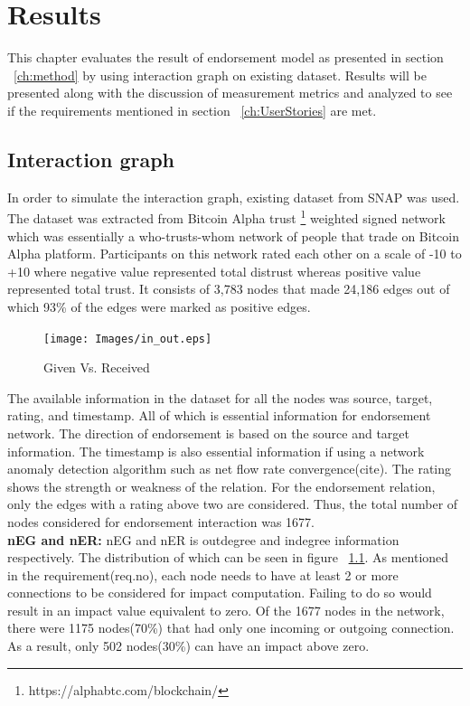 \chapter{Results} \label{ch:results}
This chapter evaluates the result of endorsement model as presented in section
~\ref{ch:method} by using interaction graph on existing dataset. Results will
be presented along with the discussion of measurement metrics and analyzed to
see if the requirements mentioned in section ~\ref{ch:UserStories} are met.  

\section{Interaction graph}
In order to simulate the interaction graph, existing dataset from SNAP
\cite{snapnets} was used. The dataset was extracted from Bitcoin Alpha trust
\footnote{https://alphabtc.com/blockchain/} weighted signed network which was
essentially a who-trusts-whom network of people that trade on Bitcoin Alpha
platform. Participants on this network rated each other on a scale of -10 to
+10 where negative value represented total distrust whereas positive value
represented total trust. It consists of 3,783 nodes that made 24,186 edges out
of which 93\% of the edges were marked as positive edges\cite{kumar2016edge}.\\
\begin{figure}[h]
	\texttt{[image: Images/in\_out.eps]}
	\caption{Given Vs. Received}
	\label{inOut}
\end{figure}
The available information in the dataset for all the nodes was source, target,
rating, and timestamp. All of which is essential information for endorsement
network. The direction of endorsement is based on the source and target
information. The timestamp is also essential information if using a network
anomaly detection algorithm such as net flow rate convergence(cite). The rating
shows the strength or weakness of the relation. For the endorsement relation,
only the edges with a rating above two are considered. Thus, the total number
of nodes considered for endorsement interaction was 1677.\\ 
\textbf{nEG and nER:} nEG and nER is outdegree and indegree information
respectively.  The distribution of which can be seen in figure ~\ref{inOut}.
As mentioned in the requirement(req.no), each node needs to have at least 2 or
more connections to be considered for impact computation. Failing to do so
would result in an impact value equivalent to zero. Of the 1677 nodes in the
network, there were 1175 nodes(70\%) that had only one incoming or outgoing
connection. As a result, only 502 nodes(30\%) can have an impact above zero.\\ 

